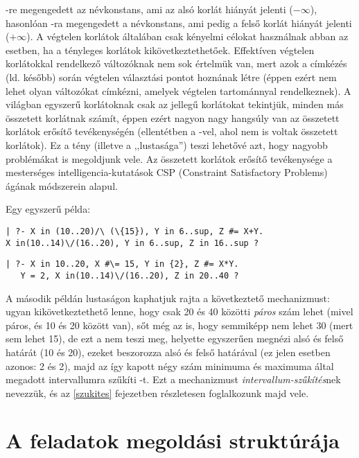 -re megengedett az  névkonstans, ami az alsó korlát
hiányát jelenti ($-\infty$), hasonlóan -ra megengedett a 
névkonstans, ami pedig a felső korlát hiányát jelenti ($+\infty$). A végtelen
korlátok általában csak kényelmi célokat használnak abban az esetben, ha
a tényleges korlátok kikövetkeztethetőek. Effektíven végtelen korlátokkal
rendelkező változóknak nem sok értelmük van, mert azok a címkézés (ld. később)
során végtelen választási pontot hoznának létre (éppen ezért nem lehet olyan
változókat címkézni, amelyek végtelen tartománnyal rendelkeznek).
\br
A \clpfd világban egyszerű korlátoknak csak az 
jellegű korlátokat tekintjük, minden más összetett korlátnak számít, éppen
ezért nagyon nagy hangsúly van az összetett korlátok erősítő tevékenységén
(ellentétben a \Clpb -vel, ahol nem is voltak összetett korlátok). Ez a tény
(illetve a \clpfd ,,lustasága'') teszi lehetővé azt, hogy nagyobb problémákat
is megoldjunk vele. Az összetett korlátok erősítő tevékenysége a mesterséges
intelligencia-kutatások CSP (Constraint Satisfactory Problems) ágának
módszerein alapul.

Egy egyszerű \clpfd példa:

\begin{verbatim}
| ?- X in (10..20)/\ (\{15}), Y in 6..sup, Z #= X+Y.
X in(10..14)\/(16..20), Y in 6..sup, Z in 16..sup ?
\end{verbatim}
\begin{verbatim}
| ?- X in 10..20, X #\= 15, Y in {2}, Z #= X*Y.
   Y = 2, X in(10..14)\/(16..20), Z in 20..40 ?
\end{verbatim}

A második példán lustaságon kaphatjuk rajta a \clpfd következtető mechanizmust:
ugyan kikövetkeztethető lenne, hogy  csak 20 és 40 közötti \emph{páros}
szám lehet (mivel  páros, és  10 és 20 között van), sőt még
az is, hogy  semmiképp nem lehet 30 (mert  sem lehet 15),
de ezt a \clpfd nem teszi meg, helyette egyszerűen megnézi  alsó és
felső határát (10 és 20), ezeket beszorozza  alsó és felső határával
(ez jelen esetben azonos: 2 és 2), majd az így kapott négy szám minimuma és
maximuma által megadott intervallumra szűkíti -t. Ezt a mechanizmust
\emph{intervallum-szűkítés}nek nevezzük, és az \ref{szukites} fejezetben
részletesen foglalkozunk majd vele.

\section{A \clpfd feladatok megoldási struktúrája}

